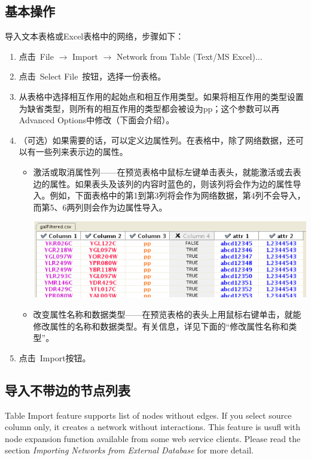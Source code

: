 \subsection{基本操作}

导入文本表格或Excel表格中的网络，步骤如下： 
\begin{enumerate}
\item 点击~File $\rightarrow$ Import $\rightarrow$ Network from Table (Text/MS Excel)... 
\item 点击~Select File~按钮，选择一份表格。 
\item 从表格中选择相互作用的起始点和相互作用类型。如果将相互作用的类型设置为缺省类型，则所有的相互作用的类型都会被设为pp；这个参数可以再Advanced Options中修改（下面会介绍）。
\item （可选）如果需要的话，可以定义边属性列。在表格中，除了网络数据，还可以有一些列来表示边的属性。
\begin{itemize}
\item 激活或取消属性列——在预览表格中鼠标左键单击表头，就能激活或去表边的属性。如果表头及该列的内容时蓝色的，则该列将会作为边的属性导入。例如，下面表格中的第1到第3列将会作为网络数据，第4列不会导入，而第5、6两列则会作为边属性导入。
\begin{center}
\includegraphics[width=.8\textwidth]{images/network_table_sample.png} 
\end{center}
\item 改变属性名称和数据类型——在预览表格的表头上用鼠标右键单击，就能修改属性的名称和数据类型。有关信息，详见下面的``修改属性名称和类型''。
\end{itemize}
\item 点击~Import按钮。 
\end{enumerate}

\subsection{导入不带边的节点列表}
 Table Import feature supports list of nodes without edges. If you select source column only, it creates a network without interactions. This feature is usufl with node expansion function available from some web service clients. Please read the section \emph{Importing Networks from External Database}
 for more detail. 

